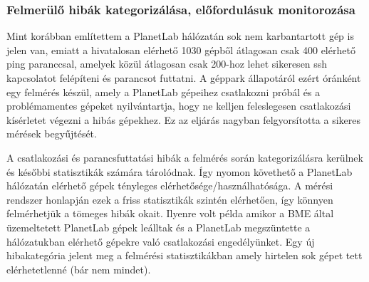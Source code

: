 \subsubsection*{Felmerülő hibák kategorizálása, előfordulásuk monitorozása}
Mint korábban említettem a PlanetLab hálózatán sok nem karbantartott gép is jelen van, emiatt a hivatalosan elérhető 1030 gépből átlagosan csak 400 elérhető ping paranccsal, amelyek közül átlagosan csak 200-hoz lehet sikeresen ssh kapcsolatot felépíteni és parancsot futtatni. A géppark állapotáról ezért óránként egy felmérés készül, amely a PlanetLab gépeihez csatlakozni próbál és a problémamentes gépeket nyilvántartja, hogy ne kelljen feleslegesen csatlakozási kísérletet végezni a hibás gépekhez. Ez az eljárás nagyban felgyorsította a sikeres mérések begyűjtését.

A csatlakozási és parancsfuttatási hibák a felmérés során kategorizálásra kerülnek és későbbi statisztikák számára tárolódnak. Így nyomon követhető a PlanetLab hálózatán elérhető gépek tényleges elérhetősége/használhatósága.
A mérési rendszer honlapján ezek a friss statisztikák szintén elérhetően, így könnyen felmérhetjük a tömeges hibák okait. Ilyenre volt példa amikor a BME által üzemeltetett PlanetLab gépek leálltak és a PlanetLab megszüntette a hálózatukban elérhető gépekre való csatlakozási engedélyünket. Egy új hibakategória jelent meg a felmérési statisztikákban amely hirtelen sok gépet tett elérhetetlenné (bár nem mindet).
